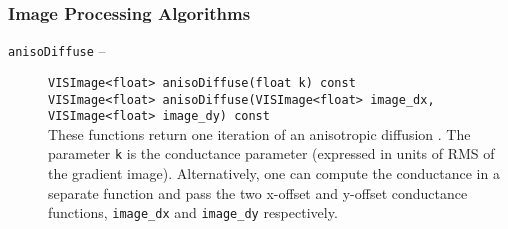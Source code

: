 \subsubsection{Image Processing Algorithms}
\label{il_ipa}
\begin{description}
\item[{\tt anisoDiffuse} --]
{\tt VISImage<float> anisoDiffuse(float k) const}\\
{\tt VISImage<float> anisoDiffuse(VISImage<float> image\_dx, VISImage<float> image\_dy) const}\\
These functions return one iteration of an anisotropic diffusion
\cite{Whitaker92b,Whitaker92a}.
The parameter {\tt k} is the conductance parameter (expressed in units of 
RMS of the gradient image).  Alternatively, one can compute the conductance in
a separate function and pass the two x-offset and y-offset conductance 
functions,  {\tt image\_dx} and {\tt image\_dy} respectively.


\end{description}
